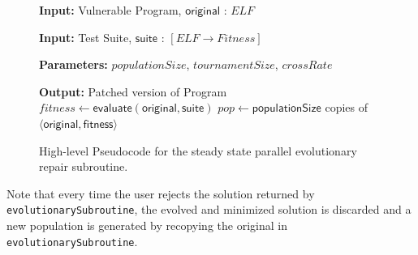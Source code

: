 \documentclass{sigcomm-alternate}
\begin{document}
\begin{figure}[htb]
\begin{algorithmic}[1]
\small
\item[{\textbf{Input: }} {Vulnerable Program, $\mathsf{original}$ : $ELF$}]
\item[{\textbf{Input: }} {Test Suite, $\mathsf{suite}$ : $[ELF \rightarrow Fitness]$}]
\item[{\textbf{Parameters: }} {$populationSize$, $tournamentSize$, $crossRate$}]
\item[{\textbf{Output: }} {Patched version of Program}] 
   $fitness \leftarrow \mathsf{evaluate}(\mathsf{original}, \mathsf{suite})$ 
   $pop \leftarrow \mathsf{populationSize}$ copies of $\langle \mathsf{original}, \mathsf{fitness} \rangle$
\end{algorithmic}
\caption{\label{evolutionary-subroutine}High-level Pseudocode for the
steady state parallel evolutionary repair subroutine.}
\end{figure}

\noindent Note that every time the user rejects the
solution returned by \texttt{evolutionarySubroutine}, the evolved and
minimized solution is discarded and a new population is generated by
recopying the original in \texttt{evolutionarySubroutine}. 
\end{document}
